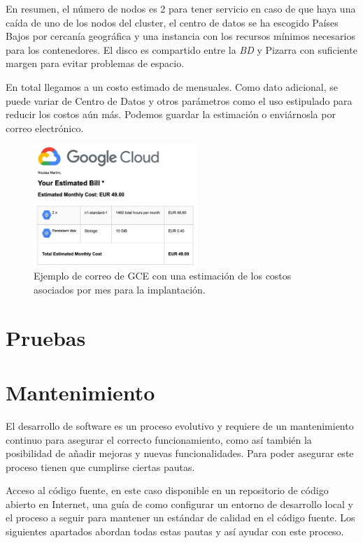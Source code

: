 \documentclass[11pt,spanish,listoffigures,listoftables]{tfgetsinf}
\begin{document}
En resumen, el número de nodos es 2 para tener servicio en caso de que haya una caída de uno de los nodos del cluster, el centro de datos se ha escogido Países Bajos por cercanía geográfica y una instancia con los recursos mínimos necesarios para los contenedores. El disco es compartido entre la \textit{BD} y Pizarra con suficiente margen para evitar problemas de espacio.

En total llegamos a un costo estimado de  mensuales. Como dato adicional, se puede variar de Centro de Datos y otros parámetros como el uso estipulado para reducir los costos aún más. Podemos guardar la estimación o enviárnosla por correo electrónico.


\begin{figure}[ht]
	\centering
	\includegraphics[width=0.55\textwidth]{img/google-cloud-engine-estimated-cost}
	\caption[Estimación de costos en GCE]{Ejemplo de correo de GCE con una estimación de los costos asociados por mes para la implantación.}
	\label{figura:gce-estimated-cost-email}
\end{figure}

\chapter{Pruebas}

\chapter{Mantenimiento}

El desarrollo de software es un proceso evolutivo y requiere de un mantenimiento continuo para asegurar el correcto funcionamiento, como así también la posibilidad de añadir mejoras y nuevas funcionalidades. Para poder asegurar este proceso tienen que cumplirse ciertas pautas.

Acceso al código fuente, en este caso disponible en un repositorio de código abierto en Internet, una guía de como configurar un entorno de desarrollo local y el proceso a seguir para mantener un estándar de calidad en el código fuente. Los siguientes apartados abordan todas estas pautas y así ayudar con este proceso.
\end{document}
